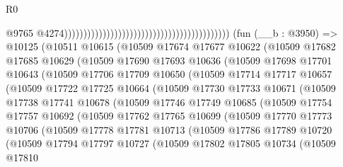 \begin{lexlean}{R0}
\begin{coremodule}
                                                                                          @9765
                                                                                          @4274)))))))))))))))))))))))))))))))))))))))))))
    (fun (__b : @3950) =>
    @10125
      (@10511
        @10615
        (@10509
          @17674
          @17677
          @10622
          (@10509
            @17682
            @17685
            @10629
            (@10509
              @17690
              @17693
              @10636
              (@10509
                @17698
                @17701
                @10643
                (@10509
                  @17706
                  @17709
                  @10650
                  (@10509
                    @17714
                    @17717
                    @10657
                    (@10509
                      @17722
                      @17725
                      @10664
                      (@10509
                        @17730
                        @17733
                        @10671
                        (@10509
                          @17738
                          @17741
                          @10678
                          (@10509
                            @17746
                            @17749
                            @10685
                            (@10509
                              @17754
                              @17757
                              @10692
                              (@10509
                                @17762
                                @17765
                                @10699
                                (@10509
                                  @17770
                                  @17773
                                  @10706
                                  (@10509
                                    @17778
                                    @17781
                                    @10713
                                    (@10509
                                      @17786
                                      @17789
                                      @10720
                                      (@10509
                                        @17794
                                        @17797
                                        @10727
                                        (@10509
                                          @17802
                                          @17805
                                          @10734
                                          (@10509
                                            @17810

\end{coremodule}
\end{lexlean}
